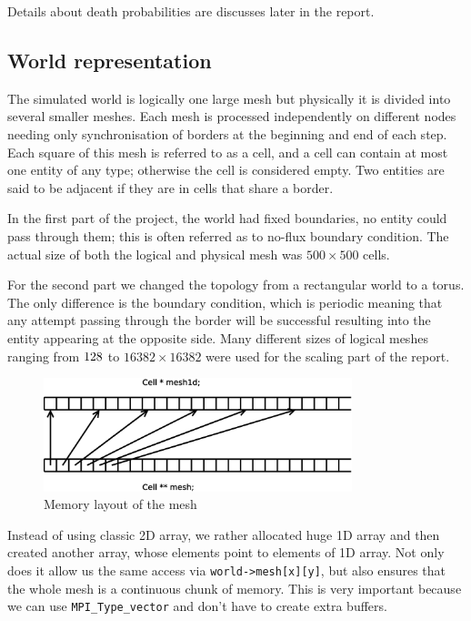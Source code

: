 \documentclass[a4paper]{article}
\begin{document}
Details about death probabilities are discusses later in the report.

\subsection{World representation}

The simulated world is logically one large mesh but physically it is divided into several smaller meshes.
Each mesh is processed independently on different nodes needing only synchronisation of borders at the beginning and end of each step.
Each square of this mesh is referred to as a cell, and a cell can contain at most one entity of any type; otherwise the cell is considered empty.
Two entities are said to be adjacent if they are in cells that share a border.

In the first part of the project, the world had fixed boundaries, no entity could pass through them; this is often referred as to no-flux boundary condition.
The actual size of both the logical and physical mesh was $500 \times 500$ cells.

For the second part we changed the topology from a rectangular world to a torus.
The only difference is the boundary condition, which is periodic meaning that any attempt passing through the border will be successful resulting into the entity appearing at the opposite side.
Many different sizes of logical meshes ranging from $128 \time 128$ to $16382 \times 16382$ were used for the scaling part of the report.

\begin{figure}[ht]
    \centering
    \includegraphics[width=0.8\textwidth]{mesh}
    \caption{Memory layout of the mesh}
\end{figure}

Instead of using classic 2D array, we rather allocated huge 1D array and then created another array, whose elements point to elements of 1D array.
Not only does it allow us the same access via \verb|world->mesh[x][y]|, but also ensures that the whole mesh is a continuous chunk of memory.
This is very important because we can use \verb|MPI_Type_vector| and don't have to create extra buffers.
\end{document}
